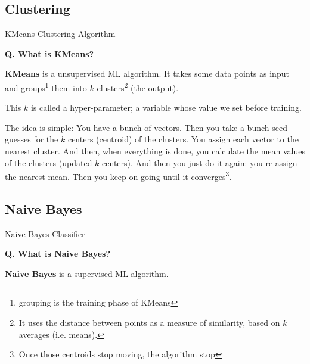 
\subsection{Clustering}
\begin{transitionsubframe}
  \begin{center}
    \Huge KMeans Clustering Algorithm
  \end{center}
\end{transitionsubframe}


\begin{frame}[fragile]{\textbf{Q. What is KMeans?}}
  \begin{wideitemize}
  \item \textbf{KMeans} is a unsupervised ML algorithm. It takes some data points
  as input and groups\footnote{grouping is the training phase of KMeans} them into $k$
  clusters\footnote{It uses the distance between points as a measure of similarity,
  based on $k$ averages (i.e. means).} (the output).\medskip
  \begin{wideitemize}
    \item This $k$ is called a hyper-parameter; a variable whose value we set before training.
    \item The idea is simple: You have a bunch of vectors. Then you take a bunch seed-guesses for the
    $k$ centers (centroid) of the clusters. You assign each vector to the nearest cluster. And then,
    when everything is done, you calculate the mean values of the clusters (updated $k$ centers).
    And then you just do it again: you re-assign the nearest mean. Then you keep on going
    until it converges\footnote{Once those centroids stop moving, the algorithm stop}.
  \end{wideitemize}
  \end{wideitemize}
\end{frame}


\subsection{Naive Bayes}
\begin{transitionsubframe}
  \begin{center}
    \Huge Naive Bayes Classifier
  \end{center}
\end{transitionsubframe}


\begin{frame}[fragile]{\textbf{Q. What is Naive Bayes?}}
  \begin{wideitemize}
  \item \textbf{Naive Bayes} is a supervised ML algorithm.
  \end{wideitemize}
\end{frame}



